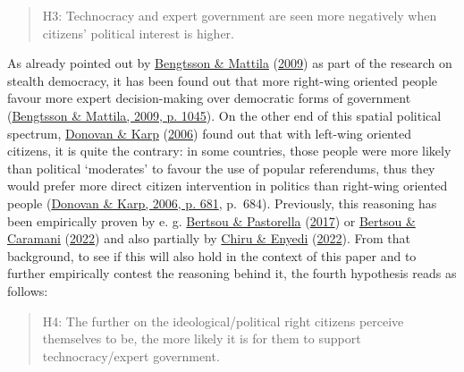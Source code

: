 \documentclass[
  12pt,
  english,
]{article}
\begin{document}
\begin{quote}
H3: Technocracy and expert government are seen more negatively when
citizens' political interest is higher.
\end{quote}

As already pointed out by
\protect\hyperlink{ref-bengtsson2009direct}{Bengtsson \& Mattila}
(\protect\hyperlink{ref-bengtsson2009direct}{2009}) as part of the
research on stealth democracy, it has been found out that more
right-wing oriented people favour more expert decision-making over
democratic forms of government
(\protect\hyperlink{ref-bengtsson2009direct}{Bengtsson \& Mattila, 2009,
p. 1045}). On the other end of this spatial political spectrum,
\protect\hyperlink{ref-donovan2006popular}{Donovan \& Karp}
(\protect\hyperlink{ref-donovan2006popular}{2006}) found out that with
left-wing oriented citizens, it is quite the contrary: in some
countries, those people were more likely than political `moderates' to
favour the use of popular referendums, thus they would prefer more
direct citizen intervention in politics than right-wing oriented people
(\protect\hyperlink{ref-donovan2006popular}{Donovan \& Karp, 2006, p.
681}, p.~684). Previously, this reasoning has been empirically proven by
e. g. \protect\hyperlink{ref-bertsou2017technocratic}{Bertsou \&
Pastorella} (\protect\hyperlink{ref-bertsou2017technocratic}{2017}) or
\protect\hyperlink{ref-bertsou2022people}{Bertsou \& Caramani}
(\protect\hyperlink{ref-bertsou2022people}{2022}) and also partially by
\protect\hyperlink{ref-chiru2022wants}{Chiru \& Enyedi}
(\protect\hyperlink{ref-chiru2022wants}{2022}). From that background, to
see if this will also hold in the context of this paper and to further
empirically contest the reasoning behind it, the fourth hypothesis reads
as follows:

\begin{quote}
H4: The further on the ideological/political right citizens perceive
themselves to be, the more likely it is for them to support
technocracy/expert government.
\end{quote}
\end{document}
